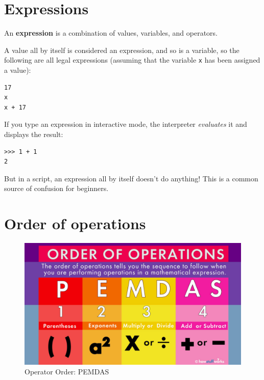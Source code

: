 \hypertarget{expresiones}{%
\section{Expressions}\label{expresiones}}

\begin{definition}
An \textbf{expression} is a combination of values, variables, and operators. 
\end{definition}

A value all by itself is considered an expression, and so is a variable, so the following are all legal expressions (assuming that the variable \texttt{x} has been assigned a value):

 

\begin{Verbatim}[frame=single]
17
x
x + 17
\end{Verbatim}

If you type an expression in interactive mode, the interpreter
\emph{evaluates} it and displays the result:

\begin{Verbatim}[frame=single]
>>> 1 + 1
2
\end{Verbatim}

But in a script, an expression all by itself doesn't do anything! This is a common source of confusion for beginners.

\hypertarget{orden-de-las-operaciones}{%
\section{Order of operations}\label{orden-de-las-operaciones}}

 

\begin{figure}[h]
    \centering
    \includegraphics[width=12cm] {images/pemdas-eng.jpg}
    \caption{Operator Order: PEMDAS}
    \label{fig:PEMDAS}
\end{figure}


